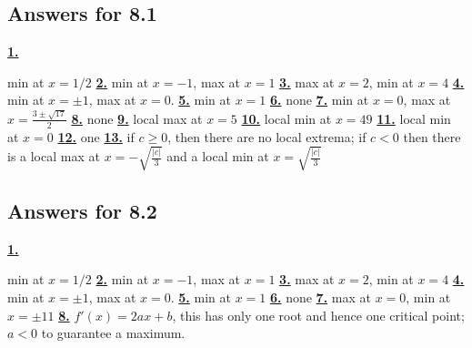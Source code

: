 \subsection *{Answers for 8.1}
\hypertarget {a:8.1.1}{\hyperlink {e:8.1.1}{\bfseries 1.}} \mdseries min at $x=1/2$\qquad 
\hypertarget {a:8.1.2}{\hyperlink {e:8.1.2}{\bfseries 2.}} \mdseries min at $x=-1$, max at $x=1$\qquad 
\hypertarget {a:8.1.3}{\hyperlink {e:8.1.3}{\bfseries 3.}} \mdseries max at $x=2$, min at $x=4$\qquad 
\hypertarget {a:8.1.4}{\hyperlink {e:8.1.4}{\bfseries 4.}} \mdseries min at $x=\pm 1$, max at $x=0$.\qquad 
\hypertarget {a:8.1.5}{\hyperlink {e:8.1.5}{\bfseries 5.}} \mdseries min at $x=1$\qquad 
\hypertarget {a:8.1.6}{\hyperlink {e:8.1.6}{\bfseries 6.}} \mdseries none\qquad 
\hypertarget {a:8.1.7}{\hyperlink {e:8.1.7}{\bfseries 7.}} \mdseries min at $x=0$, max at $x=\frac {3\pm \sqrt {17}}{2}$\qquad 
\hypertarget {a:8.1.8}{\hyperlink {e:8.1.8}{\bfseries 8.}} \mdseries none\qquad 
\hypertarget {a:8.1.9}{\hyperlink {e:8.1.9}{\bfseries 9.}} \mdseries local max at $x=5$\qquad 
\hypertarget {a:8.1.10}{\hyperlink {e:8.1.10}{\bfseries 10.}} \mdseries local min at $x=49$\qquad 
\hypertarget {a:8.1.11}{\hyperlink {e:8.1.11}{\bfseries 11.}} \mdseries local min at $x=0$\qquad 
\hypertarget {a:8.1.12}{\hyperlink {e:8.1.12}{\bfseries 12.}} \mdseries one\qquad 
\hypertarget {a:8.1.13}{\hyperlink {e:8.1.13}{\bfseries 13.}} \mdseries if $c\ge 0$, then there are no local extrema; if $c<0$ then there is a local max at $x=-\sqrt {\frac {|c|}{3}}$ and a local min at $x=\sqrt {\frac {|c|}{3}}$\qquad 
\subsection *{Answers for 8.2}
\hypertarget {a:8.2.1}{\hyperlink {e:8.2.1}{\bfseries 1.}} \mdseries min at $x=1/2$\qquad 
\hypertarget {a:8.2.2}{\hyperlink {e:8.2.2}{\bfseries 2.}} \mdseries min at $x=-1$, max at $x=1$\qquad 
\hypertarget {a:8.2.3}{\hyperlink {e:8.2.3}{\bfseries 3.}} \mdseries max at $x=2$, min at $x=4$\qquad 
\hypertarget {a:8.2.4}{\hyperlink {e:8.2.4}{\bfseries 4.}} \mdseries min at $x=\pm 1$, max at $x=0$.\qquad 
\hypertarget {a:8.2.5}{\hyperlink {e:8.2.5}{\bfseries 5.}} \mdseries min at $x=1$\qquad 
\hypertarget {a:8.2.6}{\hyperlink {e:8.2.6}{\bfseries 6.}} \mdseries none\qquad 
\hypertarget {a:8.2.7}{\hyperlink {e:8.2.7}{\bfseries 7.}} \mdseries max at $x=0$, min at $x=\pm 11$\qquad 
\hypertarget {a:8.2.8}{\hyperlink {e:8.2.8}{\bfseries 8.}} \mdseries $f'(x) = 2ax + b$, this has only one root and hence one critical point; $a<0$ to guarantee a maximum.\qquad 

